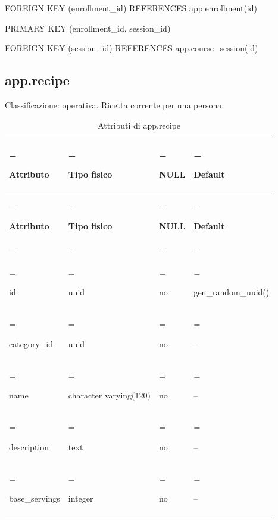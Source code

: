 \documentclass[11pt,a4paper]{article}
\begin{document}
{\ttfamily\small FOREIGN KEY (\allowbreak{}enrollment\_\allowbreak{}id) REFERENCES app.\allowbreak{}enrollment(\allowbreak{}id)}\par

{\ttfamily\small PRIMARY KEY (\allowbreak{}enrollment\_\allowbreak{}id,\allowbreak{} session\_\allowbreak{}id)}\par

{\ttfamily\small FOREIGN KEY (\allowbreak{}session\_\allowbreak{}id) REFERENCES app.\allowbreak{}course\_\allowbreak{}session(\allowbreak{}id)}\par

\subsection{app.recipe}

Classificazione: operativa. Ricetta corrente per una persona.

{\small \renewcommand{\arraystretch}{1.2}

\begin{xltabular}{\linewidth}{>{\hsize\linewidth=\hsize\raggedright\arraybackslash}X>{\hsize\linewidth=\hsize\raggedright\arraybackslash}X>{\hsize\linewidth=\hsize\raggedright\arraybackslash}X>{\hsize\linewidth=\hsize\raggedright\arraybackslash}X}
\caption{Attributi di app.recipe}\label{tab:dictionary-19}\\
\toprule

\textbf{Attributo} & \textbf{Tipo fisico} & \textbf{NULL} & \textbf{Default}\\\midrule\endfirsthead\toprule\textbf{Attributo} & \textbf{Tipo fisico} & \textbf{NULL} & \textbf{Default}\\\midrule\endhead
\midrule{}\\\endfoot\bottomrule\endlastfoot


{\ttfamily\small id} & {\ttfamily\small uuid} & no & {\ttfamily\small gen\_\allowbreak{}random\_\allowbreak{}uuid(\allowbreak{})}\\\addlinespace[3pt]

{\ttfamily\small category\_\allowbreak{}id} & {\ttfamily\small uuid} & no & {\ttfamily\small --}\\\addlinespace[3pt]

{\ttfamily\small name} & {\ttfamily\small character varying(\allowbreak{}120)} & no & {\ttfamily\small --}\\\addlinespace[3pt]

{\ttfamily\small description} & {\ttfamily\small text} & no & {\ttfamily\small --}\\\addlinespace[3pt]

{\ttfamily\small base\_\allowbreak{}servings} & {\ttfamily\small integer} & no & {\ttfamily\small --}\\*

\end{xltabular}}
\end{document}

